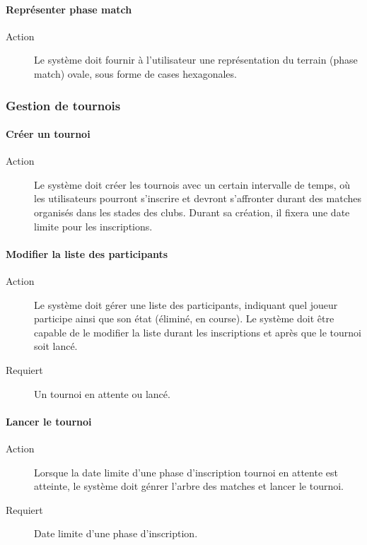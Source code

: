 \documentclass[a4paper]{article}
\begin{document}
\paragraph{Représenter phase match}
\begin{description}
\item[Action] Le système doit fournir à l'\gls{utilisateur} une représentation du terrain (phase match) ovale, sous forme de cases hexagonales.
\end{description}

\subsubsection{Gestion de tournois}
\paragraph{Créer un tournoi}
\begin{description}
\item[Action] Le système doit créer les tournois avec un certain intervalle de temps, où les \glspl{utilisateur} pourront s'inscrire et devront s'affronter durant des matches organisés dans les stades des \glspl{club}.
Durant sa création, il fixera une date limite pour les inscriptions.
\end{description}

\paragraph{Modifier la liste des participants}
\begin{description}
\item[Action] Le système doit gérer une liste des participants, indiquant quel joueur participe ainsi que son état (éliminé, en course). Le système doit être capable de le modifier la liste durant les inscriptions et après que le tournoi soit lancé.
\item[Requiert] Un tournoi en attente ou lancé.
\end{description}

\paragraph{Lancer le tournoi}
\begin{description}
\item[Action] Lorsque la date limite d'une phase d'inscription tournoi en attente est atteinte, le système doit génrer l'arbre des matches et lancer le tournoi.
\item[Requiert] Date limite d'une phase d'inscription.
\end{description}
\end{document}
